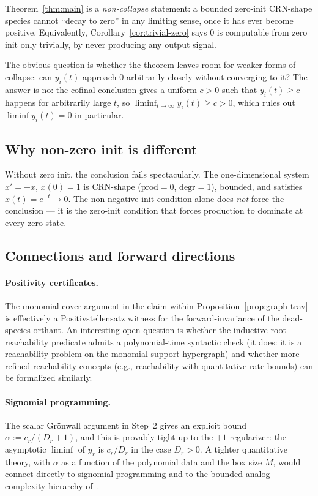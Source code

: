 \documentclass[11pt]{article}
\newcommand{\prodpoly}{\mathrm{prod}}
\newcommand{\degrpoly}{\mathrm{degr}}
\begin{document}
Theorem~\ref{thm:main} is a \emph{non-collapse} statement: a bounded
zero-init CRN-shape species cannot ``decay to zero'' in any limiting sense,
once it has ever become positive. Equivalently,
Corollary~\ref{cor:trivial-zero} says $0$ is computable from zero init only
trivially, by never producing any output signal.

The obvious question is whether the theorem leaves room for weaker forms of
collapse: can $y_i(t)$ approach $0$ arbitrarily closely without converging to
it? The answer is no: the cofinal conclusion gives a uniform $c > 0$ such
that $y_i(t) \ge c$ happens for arbitrarily large $t$, so
$\liminf_{t \to \infty} y_i(t) \ge c > 0$, which rules out
$\liminf y_i(t) = 0$ in particular.

\subsection{Why non-zero init is different}

Without zero init, the conclusion fails spectacularly. The one-dimensional
system $x' = -x$, $x(0) = 1$ is CRN-shape ($\prodpoly = 0$, $\degrpoly = 1$),
bounded, and satisfies $x(t) = e^{-t} \to 0$. The non-negative-init condition
alone does \emph{not} force the conclusion --- it is the zero-init condition
that forces production to dominate at every zero state.

\subsection{Connections and forward directions}

\paragraph{Positivity certificates.} The monomial-cover argument in the
claim within Proposition~\ref{prop:graph-trav} is effectively a Positivstellensatz
witness for the forward-invariance of the dead-species orthant. An interesting
open question is whether the inductive root-reachability predicate admits a
polynomial-time syntactic check (it does: it is a reachability problem on
the monomial support hypergraph) and whether more refined reachability
concepts (e.g., reachability with quantitative rate bounds) can be formalized
similarly.

\paragraph{Signomial programming.} The scalar Gr\"onwall argument in Step~2
gives an explicit bound $\alpha := c_r / (D_r + 1)$, and this is provably
tight up to the $+1$ regularizer: the asymptotic $\liminf$ of $y_r$ is
$c_r / D_r$ in the case $D_r > 0$. A tighter quantitative theory, with
$\alpha$ as a function of the polynomial data and the box size $M$, would
connect directly to signomial programming and to the bounded analog
complexity hierarchy of~\cite{BAC}.
\end{document}
